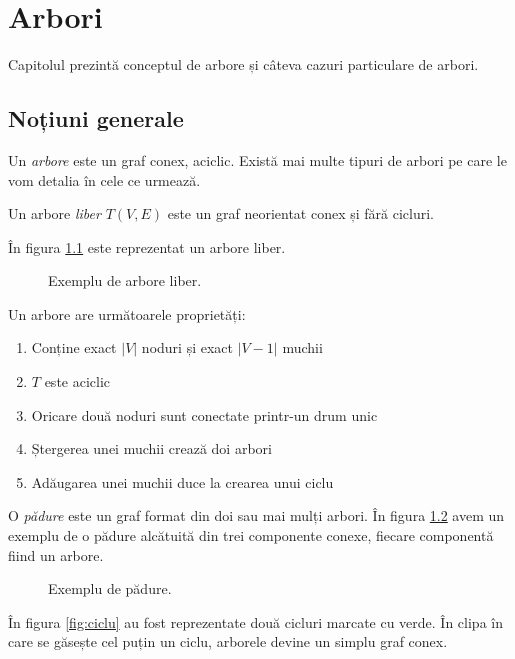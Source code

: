 \chapter{Arbori}
\label{trees}%

Capitolul prezintă conceptul de arbore și câteva cazuri particulare de arbori.

\section{Noțiuni generale}


Un \textit{arbore} este un graf conex, aciclic. Există mai multe tipuri de arbori pe care le vom detalia în cele ce urmează.

Un arbore \textit{liber} $T(V,E)$ este un graf neorientat conex și fără cicluri.

În figura \ref{fig:arboresimplu} este reprezentat un arbore liber.


\begin{figure}[H] 
	\centering	
	{
	}
	\caption{Exemplu de arbore liber.} 
	\label{fig:arboresimplu}
\end{figure}

Un arbore are următoarele proprietăți:

\begin{enumerate}
	\item Conține exact $\left |  V \right |$ noduri și exact $\left |  V-1 \right |$ muchii
	\item $T$ este aciclic
	\item Oricare două noduri sunt conectate printr-un drum unic
	\item Ștergerea unei muchii crează doi arbori
	\item Adăugarea unei muchii duce la crearea unui ciclu
\end{enumerate}

O \textit{pădure} este un graf format din doi sau mai mulți arbori. În figura \ref{fig:padure} avem un exemplu de o pădure alcătuită din trei componente conexe, fiecare componentă fiind un arbore.

\begin{figure}[H] 
	\centering	
	{
	}
	\caption{Exemplu de pădure.} 
	\label{fig:padure}
\end{figure}

În figura \ref{fig:ciclu} au fost reprezentate două cicluri marcate cu verde. În clipa în care se găsește cel puțin un ciclu, arborele devine un simplu graf conex.

